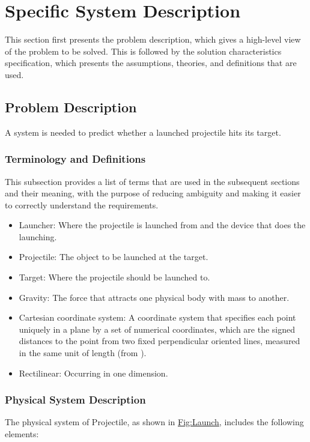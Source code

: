 \documentclass[12pt]{article}
\begin{document}
\section{Specific System Description}
\label{Sec:SpecSystDesc}
This section first presents the problem description, which gives a high-level view of the problem to be solved. This is followed by the solution characteristics specification, which presents the assumptions, theories, and definitions that are used.

\subsection{Problem Description}
\label{Sec:ProbDesc}
A system is needed to predict whether a launched projectile hits its target.

\subsubsection{Terminology and Definitions}
\label{Sec:TermDefs}
This subsection provides a list of terms that are used in the subsequent sections and their meaning, with the purpose of reducing ambiguity and making it easier to correctly understand the requirements.

\begin{itemize}
\item{Launcher: Where the projectile is launched from and the device that does the launching.}
\item{Projectile: The object to be launched at the target.}
\item{Target: Where the projectile should be launched to.}
\item{Gravity: The force that attracts one physical body with mass to another.}
\item{Cartesian coordinate system: A coordinate system that specifies each point uniquely in a plane by a set of numerical coordinates, which are the signed distances to the point from two fixed perpendicular oriented lines, measured in the same unit of length (from \cite{cartesianWiki}).}
\item{Rectilinear: Occurring in one dimension.}
\end{itemize}
\subsubsection{Physical System Description}
\label{Sec:PhysSyst}
The physical system of Projectile, as shown in \hyperref[Figure:Launch]{Fig:Launch}, includes the following elements:
\end{document}
